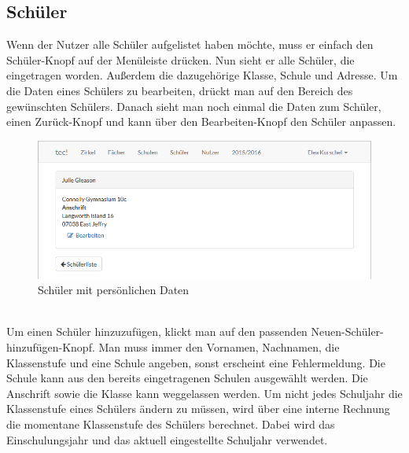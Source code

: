 \newpage \subsection{Schüler}
Wenn der Nutzer alle Schüler aufgelistet haben möchte, muss er einfach den Schüler-Knopf auf der Menüleiste drücken. Nun sieht er alle Schüler, die eingetragen worden. Außerdem die dazugehörige Klasse, Schule und Adresse. Um die Daten eines Schülers zu bearbeiten, drückt man auf den Bereich des gewünschten Schülers. Danach sieht man noch einmal die Daten zum Schüler, einen Zurück-Knopf und kann über den Bearbeiten-Knopf den Schüler anpassen.\\
\begin{figure}[ht]
	\centering
	\includegraphics[scale=.5]{bilder/Schueler_Daten.png}
	\caption{Schüler mit persönlichen Daten}
\end{figure}
\\Um einen Schüler hinzuzufügen, klickt man auf den passenden Neuen-Schüler-hinzufügen-Knopf. Man muss immer den Vornamen, Nachnamen, die Klassenstufe und eine Schule angeben, sonst erscheint eine Fehlermeldung. Die Schule kann aus den bereits eingetragenen Schulen ausgewählt werden. Die Anschrift sowie die Klasse kann weggelassen werden. Um nicht jedes Schuljahr die Klassenstufe eines Schülers ändern zu müssen, wird über eine interne Rechnung die momentane Klassenstufe des Schülers berechnet. Dabei wird das Einschulungsjahr und das aktuell eingestellte Schuljahr verwendet.

